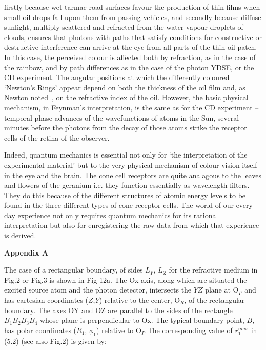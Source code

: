 {     firstly because wet tarmac road surfaces favour the production of thin films when small oil-drops
     fall upon them from passing vehicles, and secondly because diffuse sunlight, multiply scattered
    and refracted from the water vapour droplets of clouds, ensures that photons with paths that satisfy conditions
    for constructive or destructive interference can arrive at the eye from all parts of the
    thin oil-patch. In this case, the perceived colour is affected both by refraction, as in the case
   of the rainbow, and by path differences as in the case of the photon YDSE, or the CD experiment.
    The angular positions at which the differently coloured `Newton's Rings' appear depend on
     both the thickness of the oil film and, as Newton noted~\cite{Newton}, on the refractive
    index of the oil. However, the basic physical mechanism, in Feynman's interpretation, is the same as for
    the CD experiment  --temporal phase advances of the wavefunctions of atoms in the Sun,
    several minutes before the photons from the decay of those atoms strike the receptor
    cells of the retina of the observer. 
    \par Indeed, quantum mechanics is essential not only for `the interpretation of the experimental
      material' but to the very physical mechanism of colour vision itself in the eye and the brain. 
     The cone cell receptors are quite analagous to the leaves and flowers of the geranium i.e. they function
   essentially as wavelength filters. They do this because of the different structures of atomic
   energy levels to be found in the three different types of cone receptor cells. The world of our
   every-day experience not only requires quantum mechanics for its rational interpretation
   but also for enregistering the raw data from which that experience is derived.


 \newpage
  {\bf Appendix A}
 \par The case of a rectangular boundary, of sides $L_Y$, $L_Z$ for the refractive medium in Fig.2 or Fig.3
   is shown in Fig 12a. The Ox axis, along which are situated the excited source atom and the 
   photon detector, intersects the $YZ$ plane at O$_P$ and has cartesian coordinates ($Z$,$Y$)
 relative to the center, O$_R$, of the rectangular boundary. The axes OY and OZ are parallel to the sides
  of the rectangle $B_1 B_2 B_3 B_4$  whose plane is perpendicular to Ox. The
  typical boundary point, $B$, has polar coordinates ($R_1$, $\phi_1$) relative to O$_P$
   The corresponding value of $r_1^{max}$ in (5.2) (see also Fig.2) is given by:
 
}
